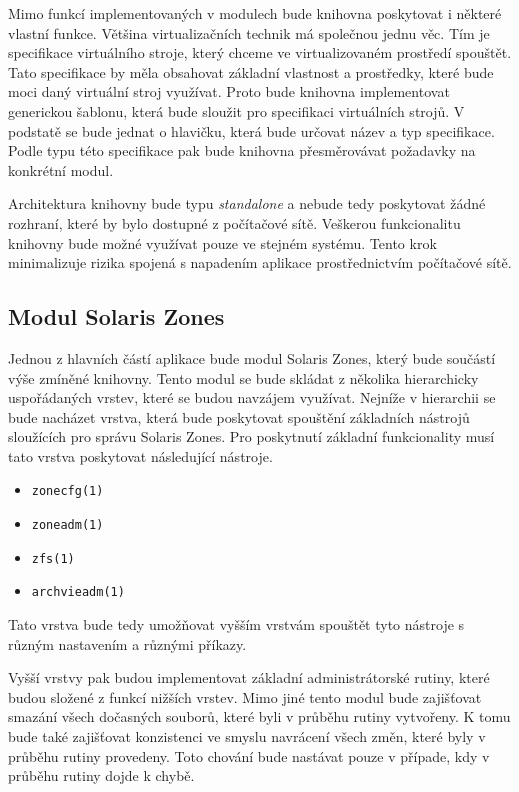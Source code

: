 Mimo funkcí implementovaných v modulech bude knihovna poskytovat i některé vlastní funkce. Většina virtualizačních technik
má společnou jednu věc. Tím je specifikace virtuálního stroje, který chceme ve virtualizovaném prostředí spouštět. Tato specifikace
by měla obsahovat základní vlastnost a prostředky, které bude moci daný virtuální stroj využívat. Proto bude knihovna implementovat
generickou šablonu, která bude sloužit pro specifikaci virtuálních strojů. V podstatě se bude jednat o hlavičku, která bude určovat
název a typ specifikace. Podle typu této specifikace pak bude knihovna přesměrovávat požadavky na konkrétní modul.

Architektura knihovny bude typu \textit{standalone} a nebude tedy poskytovat žádné rozhraní, které by bylo dostupné z počítačové
sítě. Veškerou funkcionalitu knihovny bude možné využívat pouze ve stejném systému. Tento krok minimalizuje rizika spojená s
napadením aplikace prostřednictvím počítačové sítě.
\subsection{Modul Solaris Zones}
\label{chapter:design:architecture:szones}
Jednou z hlavních částí aplikace bude modul Solaris Zones, který bude součástí výše zmíněné knihovny. Tento modul se bude skládat
z několika hierarchicky uspořádaných vrstev, které se budou navzájem využívat. Nejníže v hierarchii se bude nacházet vrstva,
která bude poskytovat spouštění základních nástrojů sloužících pro správu Solaris Zones. Pro poskytnutí základní funkcionality
musí tato vrstva poskytovat následující nástroje.
\begin{itemize}
 \item \verb|zonecfg(1)|
 \item \verb|zoneadm(1)|
 \item \verb|zfs(1)|
 \item \verb|archvieadm(1)|
\end{itemize}
Tato vrstva bude tedy umožňovat vyšším vrstvám spouštět tyto nástroje s různým nastavením a různými příkazy.

Vyšší vrstvy pak budou implementovat základní administrátorské rutiny, které budou složené z funkcí nižších vrstev. Mimo
jiné tento modul bude zajišťovat smazání všech dočasných souborů, které byli v průběhu rutiny vytvořeny. K tomu bude také
zajišťovat konzistenci ve smyslu navrácení všech změn, které byly v průběhu rutiny provedeny. Toto chování bude nastávat
pouze v případe, kdy v průběhu rutiny dojde k chybě.

